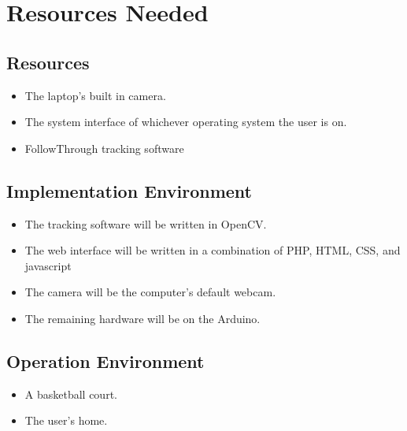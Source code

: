 \chapter{Resources Needed}

\section{Resources}
\begin{itemize}
    \item The laptop’s built in camera.
    \item The system interface of whichever operating system the user is on.
    \item FollowThrough tracking software
\end{itemize}

\section{Implementation Environment}
\begin{itemize}
    \item The tracking software will be written in OpenCV.
    \item The web interface will be written in a combination of PHP, HTML, CSS, and javascript
    \item The camera will be the computer’s default webcam.
    \item The remaining hardware will be on the Arduino.
\end{itemize}

\section{Operation Environment}
\begin{itemize}
    \item A basketball court.
    \item The user’s home.
\end{itemize}
